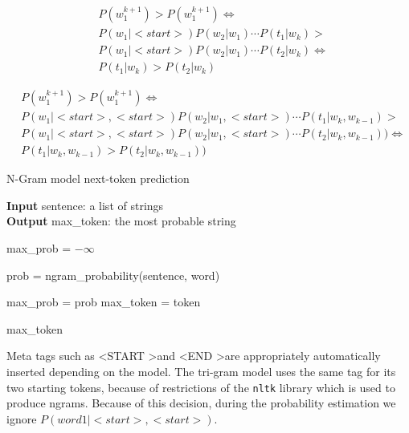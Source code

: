 \documentclass[11pt, a4paper]{article}
\begin{document}
	\begin{equation}
		\label{eq::bigram_sentence_probs}
		\begin{aligned}
			& P(w^{k+1}_1) > P(w^{k+1}_1) \iff \\
			& P(w_1|<start>) P(w_2|w_1) \cdots P(t_1|w_k) > \\
			& P(w_1|<start>) P(w_2|w_1) \cdots P(t_2|w_k) \iff \\
			& P(t_1|w_k) > P(t_2|w_k)
		\end{aligned}
	\end{equation}
	
	\begin{equation}
		\label{eq::trigram_sentence_probs}
		\begin{aligned}
			& P(w^{k+1}_1) > P(w^{k+1}_1) \iff \\
			& P(w_1|<start>, <start>) P(w_2|w_1, <start>) \cdots P(t_1|w_k, w_{k-1}) > \\ & P(w_1|<start>, <start>) P(w_2|w_1, <start>) \cdots P(t_2|w_k, w_{k-1})) \iff \\
			& P(t_1|w_k, w_{k-1}) > P(t_2|w_k, w_{k-1}))
		\end{aligned}
	\end{equation}
	
	
	\begin{algorithm}
		\caption{N-Gram model next-token prediction} 
		\label{al::next_token}
		
		\hspace*{\algorithmicindent} \textbf{Input} sentence: a list of strings\\
		\hspace*{\algorithmicindent} \textbf{Output} max\_token: the most probable string
		\begin{algorithmic}[1]
			
			\State max\_prob = $-\infty$
			
			
					\State prob = ngram\_probability(sentence, word)
					
						\State max\_prob = prob
						\State max\_token = token
					\EndIf
				
				\EndIf
			
			\EndFor
			
			\State \Return max\_token
		\end{algorithmic} 
	\end{algorithm}
	
	
	Meta tags such as \textless START \textgreater  and \textless END \textgreater  are appropriately automatically inserted depending on the model. The tri-gram model uses the same tag for its two starting tokens, because of restrictions of the \texttt{nltk} library which is used to produce ngrams. Because of this decision, during the probability estimation we ignore $P(word1 | <start>, <start> )$.
	
\end{document}
